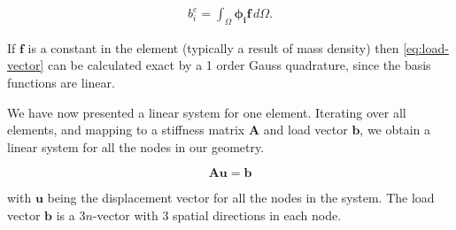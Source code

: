 \begin{align}
\label{eq:load-vector}
b^e_i = 
\int_{\Omega} \bm{\phi_i} \bm{f} \, d\Omega.
\end{align}

If $\bm{f}$ is a constant in the element (typically a result of mass density) then \eqref{eq:load-vector} can be calculated exact by a 1 order Gauss quadrature, since the basis functions are linear. 

We have now presented a linear system for one element. Iterating over all elements, and mapping to a stiffness matrix $\bm{A}$ and load vector $\bm{b}$, we obtain a linear system for all the nodes in our geometry. 

\begin{equation}
\bm{A} \bm{u} = \bm{b}
\end{equation}

with $\bm{u}$ being the displacement vector for all the nodes in the system. The load vector $\bm{b}$ is a $3n$-vector with 3 spatial directions in each node.